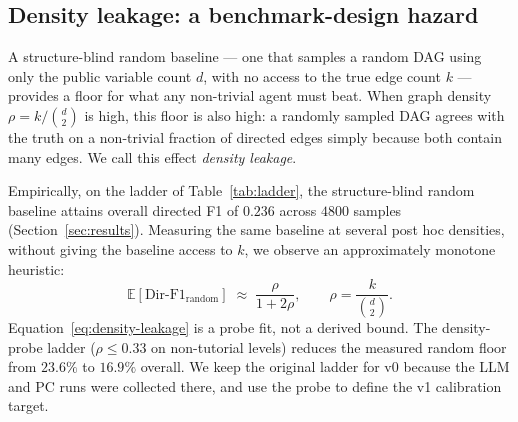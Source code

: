 \subsection{Density leakage: a benchmark-design hazard}
\label{sec:density}

A structure-blind random baseline --- one that samples a random DAG using only the public variable count $d$, with no access to the true edge count $k$ --- provides a floor for what any non-trivial agent must beat. When graph density $\rho = k / \binom{d}{2}$ is high, this floor is also high: a randomly sampled DAG agrees with the truth on a non-trivial fraction of directed edges simply because both contain many edges. We call this effect \emph{density leakage}.

Empirically, on the ladder of Table~\ref{tab:ladder}, the structure-blind random baseline attains overall directed F1 of $0.236$ across $4800$ samples (Section~\ref{sec:results}). Measuring the same baseline at several post hoc densities, without giving the baseline access to $k$, we observe an approximately monotone heuristic:
\begin{equation}
\mathbb{E}[\text{Dir-F1}_{\text{random}}] \;\approx\; \frac{\rho}{1 + 2\rho}, \qquad \rho = \frac{k}{\binom{d}{2}}.
\label{eq:density-leakage}
\end{equation}
Equation~\eqref{eq:density-leakage} is a probe fit, not a derived bound. The density-probe ladder ($\rho \le 0.33$ on non-tutorial levels) reduces the measured random floor from $23.6\%$ to $16.9\%$ overall. We keep the original ladder for v0 because the LLM and PC runs were collected there, and use the probe to define the v1 calibration target.

